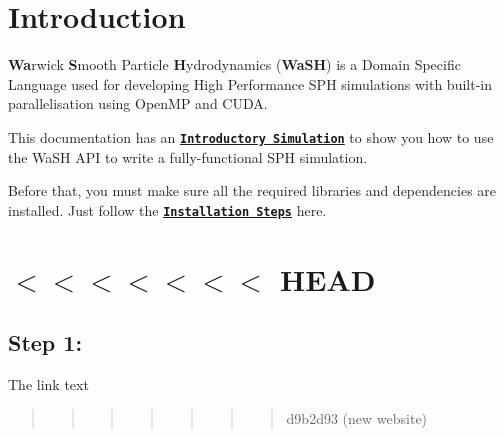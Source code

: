 \hypertarget{index_intro_sec}{}\section{Introduction}\label{index_intro_sec}
{\bfseries Wa}rwick {\bfseries S}mooth Particle {\bfseries H}ydrodynamics ({\bfseries Wa\+SH}) is a Domain Specific Language used for developing High Performance S\+PH simulations with built-\/in parallelisation using Open\+MP and C\+U\+DA.

This documentation has an \href{md_markdown_example_usecase.html}{\tt {\bfseries Introductory Simulation}} to show you how to use the Wa\+SH A\+PI to write a fully-\/functional S\+PH simulation.

Before that, you must make sure all the required libraries and dependencies are installed. Just follow the \href{md_markdown_installation.html}{\tt {\bfseries Installation Steps}} here.

\section*{$<$$<$$<$$<$$<$$<$$<$ H\+E\+AD }\hypertarget{index_step1}{}\subsection{Step 1\+:}\label{index_step1}
The link text \begin{quote}
\begin{quote}
\begin{quote}
\begin{quote}
\begin{quote}
\begin{quote}
\begin{quote}
d9b2d93 (new website)\end{quote}
\end{quote}
\end{quote}
\end{quote}
\end{quote}
\end{quote}
\end{quote}

